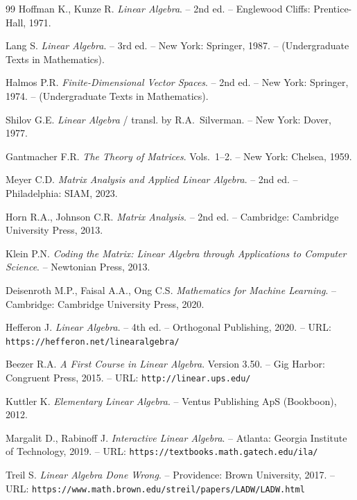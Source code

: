 \begin{thebibliography}{99}
Hoffman K., Kunze R. \textit{Linear Algebra}. – 2nd ed. – Englewood
Cliffs: Prentice-Hall, 1971.

Lang S. \textit{Linear Algebra}. – 3rd ed. – New York: Springer, 1987. –
(Undergraduate Texts in Mathematics).

Halmos P.R. \textit{Finite-Dimensional Vector Spaces}. – 2nd ed. – New York:
Springer, 1974. – (Undergraduate Texts in Mathematics).

Shilov G.E. \textit{Linear Algebra} / transl. by R.A.~Silverman. – New York:
Dover, 1977.

Gantmacher F.R. \textit{The Theory of Matrices}. Vols.~1–2. – New York:
Chelsea, 1959.

Meyer C.D. \textit{Matrix Analysis and Applied Linear Algebra}. – 2nd ed. –
Philadelphia: SIAM, 2023.

Horn R.A., Johnson C.R. \textit{Matrix Analysis}. – 2nd ed. – Cambridge:
Cambridge University Press, 2013.

Klein P.N. \textit{Coding the Matrix: Linear Algebra through Applications to
Computer Science}. – Newtonian Press, 2013.

Deisenroth M.P., Faisal A.A., Ong C.S. \textit{Mathematics for Machine
Learning}. – Cambridge: Cambridge University Press, 2020.

Hefferon J. \textit{Linear Algebra}. – 4th ed. – Orthogonal Publishing,
2020. – URL: \texttt{https:/\allowbreak /\allowbreak hefferon.\allowbreak net/\allowbreak linearalgebra/}

Beezer R.A. \textit{A First Course in Linear Algebra}. Version 3.50. –
Gig Harbor: Congruent Press, 2015. – URL: \texttt{http:/\allowbreak /\allowbreak linear.\allowbreak ups.\allowbreak edu/}

Kuttler K. \textit{Elementary Linear Algebra}. – Ventus Publishing ApS
(Bookboon), 2012.

Margalit D., Rabinoff J. \textit{Interactive Linear Algebra}. – Atlanta:
Georgia Institute of Technology, 2019. –
URL: \texttt{https:/\allowbreak /\allowbreak textbooks.\allowbreak math.\allowbreak gatech.\allowbreak edu/\allowbreak ila/}

Treil S. \textit{Linear Algebra Done Wrong}. – Providence: Brown
University, 2017. – URL: \texttt{https:/\allowbreak /\allowbreak www.\allowbreak math.\allowbreak brown.\allowbreak edu/\allowbreak streil/\allowbreak papers/\allowbreak LADW/\allowbreak LADW.\allowbreak html}


\end{thebibliography}
